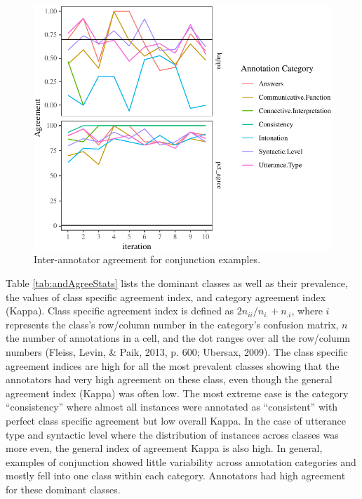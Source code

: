 \documentclass[,man,floatsintext]{apa6}
\begin{document}
\begin{figure}[tb]

{\centering \includegraphics{figs/andReliabilityPlot-1} 

}

\caption{Inter-annotator agreement for conjunction examples.}\label{fig:andReliabilityPlot}
\end{figure}

Table \ref{tab:andAgreeStats} lists the dominant classes as well as their prevalence, the values of class specific agreement index, and category agreement index (Kappa). Class specific agreement index is defined as \(2n_{ii}/n_{i.}+n_{.i}\), where \(i\) represents the class's row/column number in the category's confusion matrix, \(n\) the number of annotations in a cell, and the dot ranges over all the row/column numbers (Fleiss, Levin, \& Paik, 2013, p. 600; Ubersax, 2009). The class specific agreement indices are high for all the most prevalent classes showing that the annotators had very high agreement on these class, even though the general agreement index (Kappa) was often low. The most extreme case is the category \enquote{consistency} where almost all instances were annotated as \enquote{consistent} with perfect class specific agreement but low overall Kappa. In the case of utterance type and syntactic level where the distribution of instances across classes was more even, the general index of agreement Kappa is also high. In general, examples of conjunction showed little variability across annotation categories and mostly fell into one class within each category. Annotators had high agreement for these dominant classes.
\end{document}
